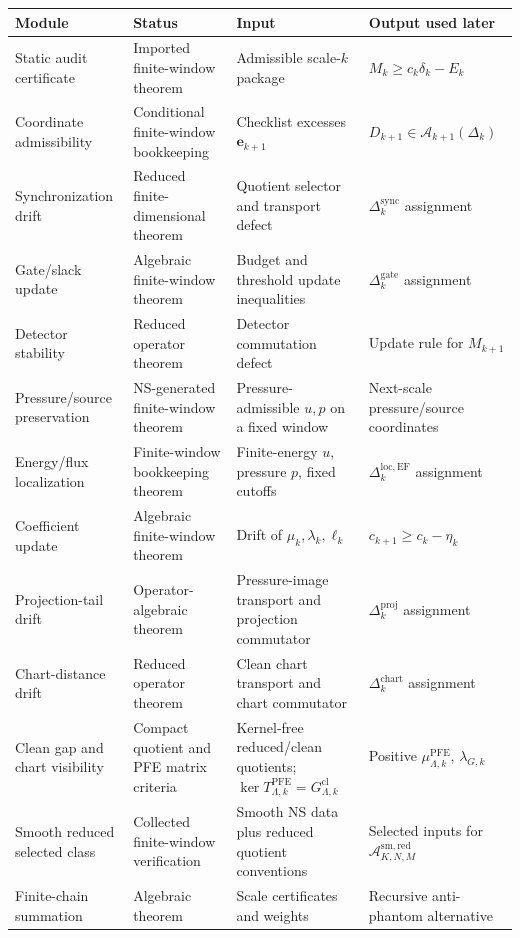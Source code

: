 \documentclass[11pt]{article}
\numberwithin{equation}{section}
\theoremstyle{plain}
\theoremstyle{definition}
\theoremstyle{remark}
\newcommand{\cl}{\mathrm{cl}}
\newcommand{\proj}{\mathrm{proj}}
\newcommand{\sync}{\mathrm{sync}}
\newcommand{\gate}{\mathrm{gate}}
\newcommand{\locerr}{\mathrm{loc}}
\newcommand{\A}{\mathcal A}
\begin{document}
\begin{center}
\small
\begin{tabular}{
  >{\raggedright\arraybackslash}p{}
  >{\raggedright\arraybackslash}p{}
  >{\raggedright\arraybackslash}p{}
  >{\raggedright\arraybackslash}p{}}
\toprule
Module & Status & Input & Output used later\\
\midrule
Static audit certificate &
Imported finite-window theorem &
Admissible scale-\(k\) package &
\(M_k\ge c_k\delta_k-E_k\)\\
Coordinate admissibility &
Conditional finite-window bookkeeping &
Checklist excesses \(\mathbf e_{k+1}\) &
\(D_{k+1}\in\mathcal A_{k+1}(\Delta_k)\)\\
Synchronization drift &
Reduced finite-dimensional theorem &
Quotient selector and transport defect &
\(\Delta_k^{\sync}\) assignment\\
Gate/slack update &
Algebraic finite-window theorem &
Budget and threshold update inequalities &
\(\Delta_k^{\gate}\) assignment\\
Detector stability &
Reduced operator theorem &
Detector commutation defect &
Update rule for \(M_{k+1}\)\\
Pressure/source preservation &
NS-generated finite-window theorem &
Pressure-admissible \(u,p\) on a fixed window &
Next-scale pressure/source coordinates\\
Energy/flux localization &
Finite-window bookkeeping theorem &
Finite-energy \(u\), pressure \(p\), fixed cutoffs &
\(\Delta_k^{\locerr,\mathrm{EF}}\) assignment\\
Coefficient update &
Algebraic finite-window theorem &
Drift of \(\mu_k,\lambda_k,\ell_k\) &
\(c_{k+1}\ge c_k-\eta_k\)\\
Projection-tail drift &
Operator-algebraic theorem &
Pressure-image transport and projection commutator &
\(\Delta_k^{\proj}\) assignment\\
Chart-distance drift &
Reduced operator theorem &
Clean chart transport and chart commutator &
\(\Delta_k^{\mathrm{chart}}\) assignment\\
Clean gap and chart visibility &
Compact quotient and PFE matrix criteria &
Kernel-free reduced/clean quotients; \(\ker T_{\Lambda,k}^{\mathrm{PFE}}
=G_{\Lambda,k}^{\cl}\) &
Positive \(\mu_{\Lambda,k}^{\mathrm{PFE}}\), \(\lambda_{G,k}\)\\
Smooth reduced selected class &
Collected finite-window verification &
Smooth NS data plus reduced quotient conventions &
Selected inputs for \(\A_{K,N,M}^{\mathrm{sm,red}}\)\\
Finite-chain summation &
Algebraic theorem &
Scale certificates and weights &
Recursive anti-phantom alternative\\
\bottomrule
\end{tabular}
\end{center}
\end{document}
